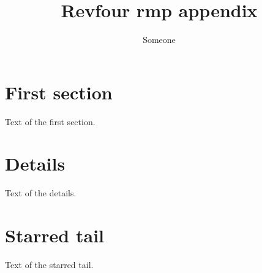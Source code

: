 \documentclass[rmp]{revtex4}
\begin{document}
\title{Revfour rmp appendix}
\author{Someone}
\maketitle
\section{First section}
Text of the first section.
\appendix*
\section{Details}
Text of the details.
\section*{Starred tail}
Text of the starred tail.
\end{document}
